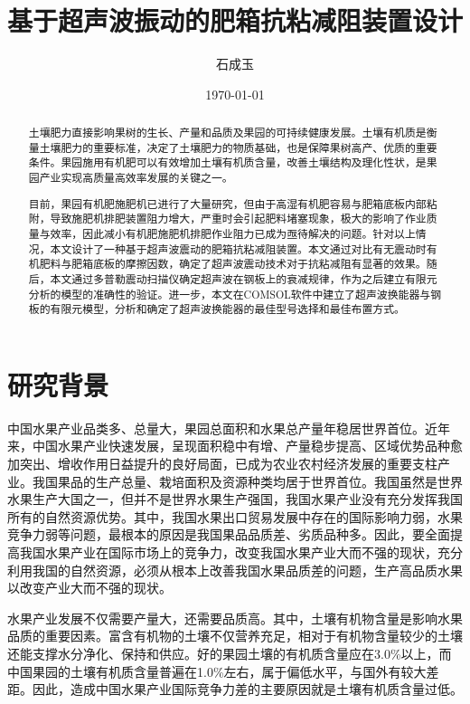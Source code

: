\documentclass[fontset=none,12pt,a4paper,titlepage,UTF8]{ctexart}
\author{石成玉}
\date{\today}
\title{基于超声波振动的肥箱抗粘减阻装置设计}
\begin{document}
\maketitle

\begin{abstract}

  土壤肥力直接影响果树的生长、产量和品质及果园的可持续健康发展。土壤有机质是衡量土壤肥力的重要标准，决定了土壤肥力的物质基础，也是保障果树高产、优质的重要条件。果园施用有机肥可以有效增加土壤有机质含量，改善土壤结构及理化性状，是果园产业实现高质量高效率发展的关键之一。

  目前，果园有机肥施肥机已进行了大量研究，但由于高湿有机肥容易与肥箱底板内部粘附，导致施肥机排肥装置阻力增大，严重时会引起肥料堵塞现象，极大的影响了作业质量与效率，因此减小有机肥施肥机排肥作业阻力已成为亟待解决的问题。针对以上情况，本文设计了一种基于超声波震动的肥箱抗粘减阻装置。本文通过对比有无震动时有机肥料与肥箱底板的摩擦因数，确定了超声波震动技术对于抗粘减阻有显著的效果。随后，本文通过多普勒震动扫描仪确定超声波在钢板上的衰减规律，作为之后建立有限元分析的模型的准确性的验证。进一步，本文在COMSOL软件中建立了超声波换能器与钢板的有限元模型，分析和确定了超声波换能器的最佳型号选择和最佳布置方式。

\end{abstract}

\tableofcontents

\newpage

\section{研究背景}

中国水果产业品类多、总量大，果园总面积和水果总产量年稳居世界首位。近年来，中国水果产业快速发展，呈现面积稳中有增、产量稳步提高、区域优势品种愈加突出、增收作用日益提升的良好局面，已成为农业农村经济发展的重要支柱产业。我国果品的生产总量、栽培面积及资源种类均居于世界首位。我国虽然是世界水果生产大国之一，但并不是世界水果生产强国，我国水果产业没有充分发挥我国所有的自然资源优势。其中，我国水果出口贸易发展中存在的国际影响力弱，水果竞争力弱等问题，最根本的原因是我国果品品质差、劣质品种多。因此，要全面提高我国水果产业在国际市场上的竞争力，改变我国水果产业大而不强的现状，充分利用我国的自然资源，必须从根本上改善我国水果品质差的问题，生产高品质水果以改变产业大而不强的现状。

水果产业发展不仅需要产量大，还需要品质高。其中，土壤有机物含量是影响水果品质的重要因素。富含有机物的土壤不仅营养充足，相对于有机物含量较少的土壤还能支撑水分净化、保持和供应。好的果园土壤的有机质含量应在3.0\%以上，而中国果园的土壤有机质含量普遍在1.0\%左右，属于偏低水平，与国外有较大差距。因此，造成中国水果产业国际竞争力差的主要原因就是土壤有机质含量过低。
\end{document}
